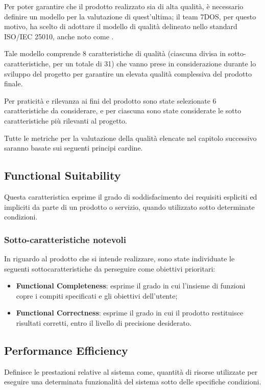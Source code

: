 Per poter garantire che il prodotto realizzato sia di alta qualità, è necessario definire un modello per la valutazione di quest'ultima; il team 7DOS, per questo motivo, ha scelto di adottare il modello di qualità delineato nello standard ISO/IEC 25010, anche noto come .

Tale modello comprende 8 caratteristiche di qualità (ciascuna divisa in sotto-caratteristiche, per un totale di 31) che vanno prese in considerazione durante lo sviluppo del progetto per garantire un elevata qualità complessiva del prodotto finale.

Per praticità e rilevanza ai fini del prodotto sono state selezionate 6 caratteristiche da considerare, e per ciascuna sono state considerate le sotto caratteristiche più rilevanti al progetto. 

Tutte le metriche per la valutazione della qualità elencate nel capitolo successivo saranno basate sui seguenti principi cardine.

\subsection{Functional Suitability}
Questa caratteristica esprime il grado di soddisfacimento dei requisiti espliciti ed impliciti da parte di un prodotto o servizio, quando utilizzato sotto determinate condizioni.
\subsubsection{Sotto-caratteristiche notevoli}
In riguardo al prodotto che si intende realizzare, sono state individuate le seguenti sottocaratteristiche da perseguire come obiettivi prioritari: 
\begin{itemize}
	\item{\textbf{Functional Completeness}}: esprime il grado in cui l'insieme di funzioni copre i compiti specificati e gli obiettivi dell'utente;
	\item{\textbf{Functional Correctness}}: esprime il grado in cui il prodotto restituisce risultati corretti, entro il livello di precisione desiderato.
\end{itemize}

\subsection{Performance Efficiency}
Definisce le prestazioni relative al sistema come, quantità di risorse utilizzate per eseguire una determinata funzionalità del sistema sotto delle specifiche condizioni. 
